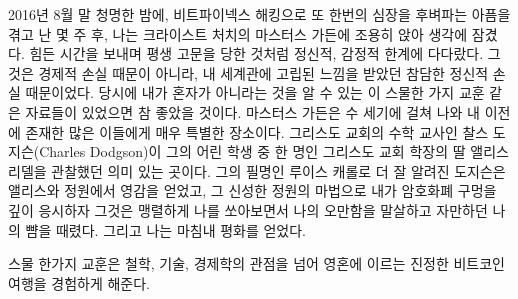 
2016년 8월 말 청명한 밤에, 비트파이넥스 해킹으로 또 한번의 심장을 후벼파는 아픔을 겪고 난 몇 주 후, 나는 크라이스트 처치의 마스터스 가든에 조용히 앉아 생각에 잠겼다. 
힘든 시간을 보내며 평생 고문을 당한 것처럼 정신적, 감정적 한계에 다다랐다. 그것은 경제적 손실 때문이 아니라, 내 세계관에 고립된 느낌을 받았던 참담한 정신적 손실 때문이었다. 
당시에 내가 혼자가 아니라는 것을 알 수 있는 이 스물한 가지 교훈 같은 자료들이 있었으면 참 좋았을 것이다. 
마스터스 가든은 수 세기에 걸쳐 나와 내 이전에 존재한 많은 이들에게 매우 특별한 장소이다.
그리스도 교회의 수학 교사인 찰스 도지슨(Charles Dodgson)이 그의 어린 학생 중 한 명인 그리스도 교회 학장의 딸 앨리스 리델을 관찰했던 의미 있는 곳이다.
그의 필명인 루이스 캐롤로 더 잘 알려진 도지슨은 앨리스와 정원에서 영감을 얻었고, 그 신성한 정원의 마법으로 내가 암호화폐 구멍을 깊이 응시하자
그것은 맹렬하게 나를 쏘아보면서 나의 오만함을 말살하고 자만하던 나의 뺨을 때렸다. 그리고 나는 마침내 평화를 얻었다. 

스물 한가지 교훈은 철학, 기술, 경제학의 관점을 넘어 영혼에 이르는 진정한 비트코인 여행을 경험하게 해준다.


